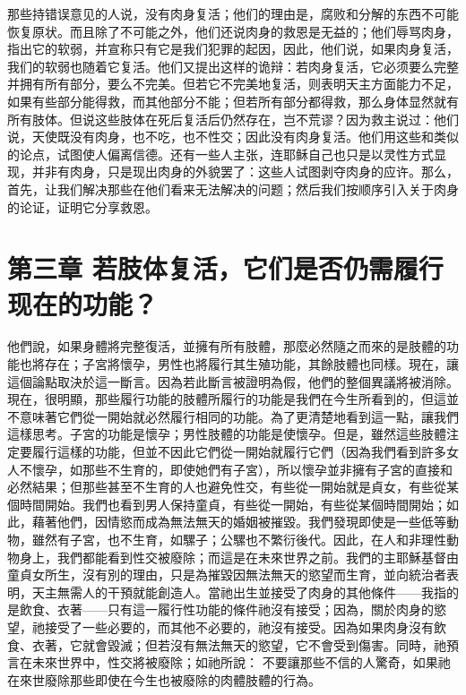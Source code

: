 那些持错误意见的人说，没有肉身复活；他们的理由是，腐败和分解的东西不可能恢复原状。而且除了不可能之外，他们还说肉身的救恩是无益的；他们辱骂肉身，指出它的软弱，并宣称只有它是我们犯罪的起因，因此，他们说，如果肉身复活，我们的软弱也随着它复活。他们又提出这样的诡辩：若肉身复活，它必须要么完整并拥有所有部分，要么不完美。但若它不完美地复活，则表明天主方面能力不足，如果有些部分能得救，而其他部分不能；但若所有部分都得救，那么身体显然就有所有肢体。但说这些肢体在死后复活后仍然存在，岂不荒谬？因为救主说过：他们说，天使既没有肉身，也不吃，也不性交；因此没有肉身复活。他们用这些和类似的论点，试图使人偏离信德。还有一些人主张，连耶稣自己也只是以灵性方式显现，并非有肉身，只是现出肉身的外貌罢了：这些人试图剥夺肉身的应许。那么，首先，让我们解决那些在他们看来无法解决的问题；然后我们按顺序引入关于肉身的论证，证明它分享救恩。\par


\section{第三章 若肢体复活，它们是否仍需履行现在的功能？}

他們說，如果身體將完整復活，並擁有所有肢體，那麼必然隨之而來的是肢體的功能也將存在；子宮將懷孕，男性也將履行其生殖功能，其餘肢體也同樣。現在，讓這個論點取決於這一斷言。因為若此斷言被證明為假，他們的整個異議將被消除。現在，很明顯，那些履行功能的肢體所履行的功能是我們在今生所看到的，但這並不意味著它們從一開始就必然履行相同的功能。為了更清楚地看到這一點，讓我們這樣思考。子宮的功能是懷孕；男性肢體的功能是使懷孕。但是，雖然這些肢體注定要履行這樣的功能，但並不因此它們從一開始就履行它們（因為我們看到許多女人不懷孕，如那些不生育的，即使她們有子宮），所以懷孕並非擁有子宮的直接和必然結果；但那些甚至不生育的人也避免性交，有些從一開始就是貞女，有些從某個時間開始。我們也看到男人保持童貞，有些從一開始，有些從某個時間開始；如此，藉著他們，因情慾而成為無法無天的婚姻被摧毀。我們發現即使是一些低等動物，雖然有子宮，也不生育，如騾子；公騾也不繁衍後代。因此，在人和非理性動物身上，我們都能看到性交被廢除；而這是在未來世界之前。我們的主耶穌基督由童貞女所生，沒有別的理由，只是為摧毀因無法無天的慾望而生育，並向統治者表明，天主無需人的干預就能創造人。當祂出生並接受了肉身的其他條件——我指的是飲食、衣著——只有這一履行性功能的條件祂沒有接受；因為，關於肉身的慾望，祂接受了一些必要的，而其他不必要的，祂沒有接受。因為如果肉身沒有飲食、衣著，它就會毀滅；但若沒有無法無天的慾望，它不會受到傷害。同時，祂預言在未來世界中，性交將被廢除；如祂所說： 不要讓那些不信的人驚奇，如果祂在來世廢除那些即使在今生也被廢除的肉體肢體的行為。\par

